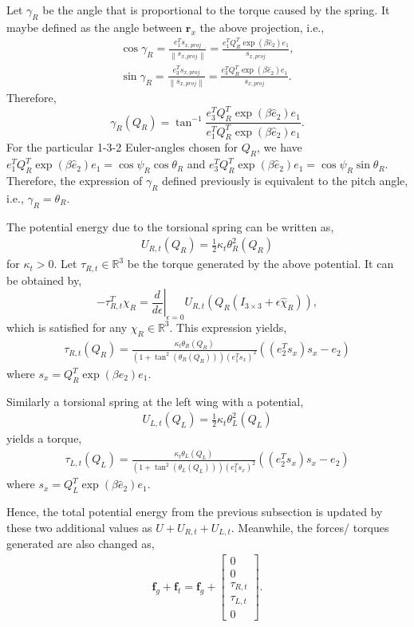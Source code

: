 \documentclass[10pt]{article}
\newcommand{\norm}[1]{\ensuremath{\left\| #1 \right\|}}
\renewcommand{\Re}{\ensuremath{\mathbb{R}}}
\begin{document}
Let $ \gamma_R $ be the angle that is proportional to the torque caused by the spring.
It maybe defined as the angle between $ \mathbf{r}_x $ the above projection, i.e.,
\begin{align}
	\cos{\gamma_R} = \frac{e_1^T s_{x,proj}}{\norm{s_{x,proj}}} = \frac{e_1^T Q_R^T \exp(\beta \hat{e}_2) e_1}{s_{x,proj}}, \\
	\sin{\gamma_R} = \frac{e_3^T s_{x,proj}}{\norm{s_{x,proj}}} = \frac{e_3^T Q_R^T \exp(\beta \hat{e}_2) e_1}{s_{x,proj}}.
\end{align}
Therefore,
\[
\gamma_R(Q_R) = \tan^{-1} \frac{e_3^T Q_R^T \exp(\beta \hat{e}_2) e_1}{e_1^T Q_R^T \exp(\beta \hat{e}_2) e_1}.
\]
For the particular 1-3-2 Euler-angles chosen for $ Q_R $, we have $ e_1^T Q_R^T \exp(\beta \hat{e}_2) e_1 = \cos\psi_R \cos\theta_R $ and $ e_3^T Q_R^T \exp(\beta \hat{e}_2) e_1 = \cos\psi_R \sin\theta_R $.
Therefore, the expression of $ \gamma_R $ defined previously is equivalent to the pitch angle, i.e., $ \gamma_R = \theta_R $.

The potential energy due to the torsional spring can be written as,
\begin{align}
	U_{R,t}(Q_R) = \frac{1}{2}\kappa_t \theta_R^2(Q_R)
\end{align}
for $ \kappa_t > 0 $.
Let $ \tau_{R,t} \in \Re^3 $ be the torque generated by the above potential.
It can be obtained by,
\[
-\tau_{R,t}^T \chi_R = \left. \frac{d}{d\epsilon} \right|_{\epsilon = 0} U_{R,t}(Q_R(I_{3\times 3} + \epsilon \hat{\chi}_R)),
\]
which is satisfied for any $ \chi_R \in \Re^3 $.
This expression yields,
\begin{align}
	\tau_{R,t}(Q_R) = \frac{\kappa_t \theta_R(Q_R)}{(1 + \tan^2 (\theta_R(Q_R))) (e_1^T s_x)^2} ((e_2^T s_x) s_x - e_2)
\end{align}
where $ s_x = Q_R^T \exp(\beta \hat{e}_2) e_1 $.

Similarly a torsional spring at the left wing with a potential,
\begin{align}
	U_{L,t}(Q_L) = \frac{1}{2}\kappa_t \theta_L^2(Q_L)
\end{align}
yields a torque,
\begin{align}
	\tau_{L,t}(Q_L) = \frac{\kappa_t \theta_L(Q_L)}{(1 + \tan^2 (\theta_L(Q_L))) (e_1^T s_x)^2} ((e_2^T s_x) s_x - e_2)
\end{align}
where $ s_x = Q_L^T \exp(\beta \hat{e}_2) e_1 $.

Hence, the total potential energy from the previous subsection is updated by these two additional values as $ U + U_{R,t} + U_{L,t} $.
Meanwhile, the forces/ torques generated are also changed as,
\begin{align}
	\mathbf{f}_g + \mathbf{f}_t = \mathbf{f}_g + \begin{bmatrix}
		0 \\
		0  \\
		\tau_{R,t} \\
		\tau_{L,t} \\
		0
\end{bmatrix}.
\end{align}
\end{document}
